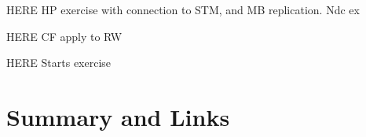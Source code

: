 \documentclass[a4paper]{book}
\begin{document}
%  
% 
% 



HERE  HP exercise with connection to STM, and MB replication.  Ndc ex

HERE CF apply to RW

HERE  Starts exercise
















\chapter{Summary and Links}
\end{document}
